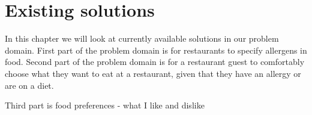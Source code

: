 \chapter{Existing solutions}
In this chapter we will look at currently available solutions in our problem domain. 
First part of the problem domain is for restaurants to specify allergens in food.
Second part of the problem domain is for a restaurant guest to comfortably choose what they want to eat at a restaurant, given that they have an allergy or are on a diet.

Third part is 
food preferences - what I like and dislike
